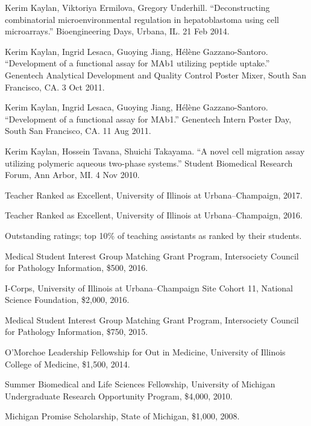 \documentclass[11pt,article,oneside]{memoir}
\begin{document}
\ind Kerim Kaylan, Viktoriya Ermilova, Gregory Underhill. ``Deconstructing combinatorial microenvironmental regulation in hepatoblastoma using cell microarrays.'' Bioengineering Days, Urbana, IL. 21 Feb 2014.

\ind Kerim Kaylan, Ingrid Lesaca, Guoying Jiang, H\'el\`ene Gazzano-Santoro. ``Development of a functional assay for MAb1 utilizing peptide uptake.'' Genentech Analytical Development and Quality Control Poster Mixer, South San Francisco, CA. 3 Oct 2011.

\ind Kerim Kaylan, Ingrid Lesaca, Guoying Jiang, H\'el\`ene Gazzano-Santoro. ``Development of a functional assay for MAb1.'' Genentech Intern Poster Day, South San Francisco, CA. 11 Aug 2011.

\ind Kerim Kaylan, Hossein Tavana, Shuichi Takayama. ``A novel cell migration assay utilizing polymeric aqueous two-phase systems.'' Student Biomedical Research Forum, Ann Arbor, MI. 4 Nov 2010.

\pagebreak


\ind Teacher Ranked as Excellent, University of Illinois at Urbana--Champaign, 2017.

\ind Teacher Ranked as Excellent, University of Illinois at Urbana--Champaign, 2016.

\ind \hspace{0.35in} \footnotesize Outstanding ratings; top 10\% of teaching assistants as ranked by their students. \normalsize\vspace{0.05in}

\ind Medical Student Interest Group Matching Grant Program, Intersociety Council for Pathology Information, \$500, 2016.

\ind I-Corps, University of Illinois at Urbana--Champaign Site Cohort 11, National Science Foundation, \$2,000, 2016.

\ind Medical Student Interest Group Matching Grant Program, Intersociety Council for Pathology Information, \$750, 2015.

\ind O'Morchoe Leadership Fellowship for Out in Medicine, University of Illinois College of Medicine, \$1,500, 2014.

\ind Summer Biomedical and Life Sciences Fellowship, University of Michigan Undergraduate Research Opportunity Program, \$4,000, 2010.

\ind Michigan Promise Scholarship, State of Michigan, \$1,000, 2008.
\end{document}
